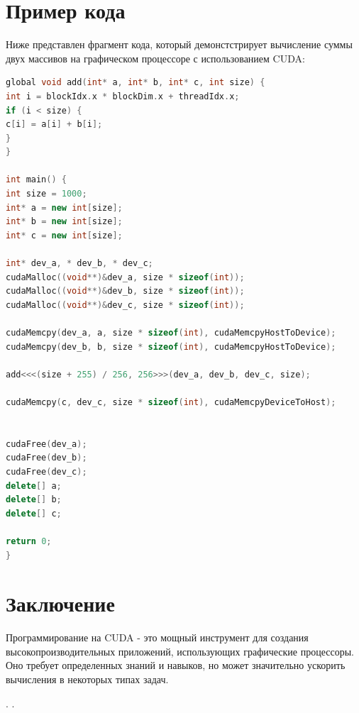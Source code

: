 \documentclass[a4paper, 12pt]{article}
\begin{document}
\section{Пример кода}
Ниже представлен фрагмент кода, который демонстстрирует вычисление суммы двух массивов на графическом процессоре с использованием CUDA:

\begin{lstlisting}[language=C++, basicstyle=\small]
global void add(int* a, int* b, int* c, int size) {
int i = blockIdx.x * blockDim.x + threadIdx.x;
if (i < size) {
c[i] = a[i] + b[i];
}
}

int main() {
int size = 1000;
int* a = new int[size];
int* b = new int[size];
int* c = new int[size];

int* dev_a, * dev_b, * dev_c;
cudaMalloc((void**)&dev_a, size * sizeof(int));
cudaMalloc((void**)&dev_b, size * sizeof(int));
cudaMalloc((void**)&dev_c, size * sizeof(int));

cudaMemcpy(dev_a, a, size * sizeof(int), cudaMemcpyHostToDevice);
cudaMemcpy(dev_b, b, size * sizeof(int), cudaMemcpyHostToDevice);

add<<<(size + 255) / 256, 256>>>(dev_a, dev_b, dev_c, size);

cudaMemcpy(c, dev_c, size * sizeof(int), cudaMemcpyDeviceToHost);


cudaFree(dev_a);
cudaFree(dev_b);
cudaFree(dev_c);
delete[] a;
delete[] b;
delete[] c;

return 0;
}
\end{lstlisting}

\section{Заключение}
Программирование на CUDA - это мощный инструмент для создания высокопроизводительных приложений, использующих графические процессоры. Оно требует определенных знаний и навыков, но может значительно ускорить вычисления в некоторых типах задач.





\cite{demidov2013programming}.
\cite{langdon2014genetically}.



\end{document}
